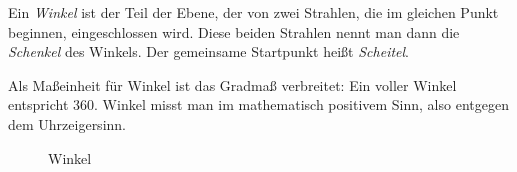 \begin{defi}[Winkel]
 Ein \emph{Winkel} ist der Teil der Ebene, der von zwei Strahlen, die im gleichen Punkt beginnen, eingeschlossen wird. Diese beiden Strahlen nennt man dann die \emph{Schenkel} des Winkels. Der gemeinsame Startpunkt heißt \emph{Scheitel}.
 
 Als Maßeinheit für Winkel ist das Gradmaß verbreitet: Ein voller Winkel entspricht 360\degree{}. Winkel misst man im mathematisch positivem Sinn, also entgegen dem Uhrzeigersinn.
 
 \begin{figure}
 
  \begin{center}
               \end{center}
\caption{Winkel}
\end{figure}

\end{defi}

